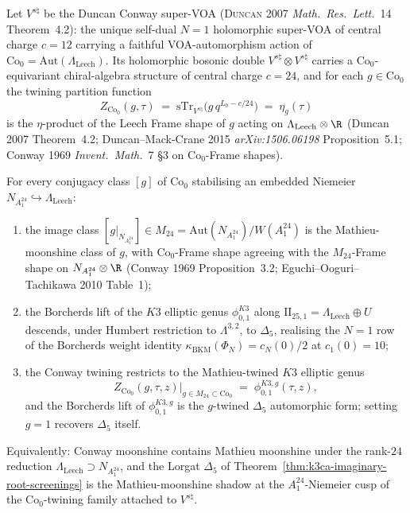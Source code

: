 \begin{proposition}
\label{prop:k3ca-conway-mathieu-reduction-Delta5}
Let $V^{s\natural}$ be the Duncan Conway super-VOA
(\textsc{Duncan 2007} \emph{Math.\ Res.\ Lett.}~14 Theorem~4.2):
the unique self-dual $N=1$ holomorphic super-VOA of central charge
$c=12$ carrying a faithful VOA-automorphism action of
$\mathrm{Co}_0 = \mathrm{Aut}(\Lambda_{\mathrm{Leech}})$. Its
holomorphic bosonic double $V^{s\natural}\otimes V^{s\natural}$
carries a $\mathrm{Co}_0$-equivariant chiral-algebra structure of
central charge $c=24$, and for each $g\in\mathrm{Co}_0$ the twining
partition function
\[
 Z_{\mathrm{Co}_0}(g,\tau)\;=\;\mathrm{sTr}_{V^{s\natural}}\bigl(g\,q^{L_0-c/24}\bigr)
 \;=\;\eta_g(\tau)
\]
is the $\eta$-product of the Leech Frame shape of $g$ acting on
$\Lambda_{\mathrm{Leech}}\otimes\R$
\textup{(}Duncan 2007 Theorem~4.2; Duncan--Mack-Crane 2015
\emph{arXiv:1506.06198} Proposition~5.1; Conway 1969 \emph{Invent.\
Math.}~7 \S3 on $\mathrm{Co}_0$-Frame shapes\textup{)}.

For every conjugacy class $[g]$ of $\mathrm{Co}_0$ stabilising an
embedded Niemeier $N_{A_1^{24}}\hookrightarrow\Lambda_{\mathrm{Leech}}$:
\begin{enumerate}[label=\textup{(\roman*)}]
 \item the image class
 $[g|_{N_{A_1^{24}}}]\in M_{24} =
 \mathrm{Aut}(N_{A_1^{24}})/W(A_1^{24})$ is the Mathieu-moonshine
 class of $g$, with $\mathrm{Co}_0$-Frame shape agreeing with the
 $M_{24}$-Frame shape on $N_{A_1^{24}}\otimes\R$
 \textup{(}Conway 1969 Proposition~3.2; Eguchi--Ooguri--Tachikawa
 2010 Table~1\textup{)};
 \item the Borcherds lift of the $K3$ elliptic genus
 $\phi_{0,1}^{K3}$ along $\mathrm{II}_{25,1} =
 \Lambda_{\mathrm{Leech}}\oplus U$ descends, under Humbert
 restriction to $\Lambda^{3,2}$, to $\Delta_5$, realising the
 $N=1$ row of the Borcherds weight identity
 $\kappa_{\mathrm{BKM}}(\Phi_N) = c_N(0)/2$ at $c_1(0)=10$;
 \item the Conway twining restricts to the Mathieu-twined $K3$
 elliptic genus
 \[
 Z_{\mathrm{Co}_0}(g,\tau,z)\bigr|_{g\in M_{24}\subset\mathrm{Co}_0}
 \;=\;\phi_{0,1}^{K3,g}(\tau,z),
 \]
 and the Borcherds lift of $\phi_{0,1}^{K3,g}$ is the $g$-twined
 $\Delta_5$ automorphic form; setting $g=1$ recovers $\Delta_5$
 itself.
\end{enumerate}
Equivalently: Conway moonshine contains Mathieu moonshine under the
rank-$24$ reduction $\Lambda_{\mathrm{Leech}}\supset N_{A_1^{24}}$,
and the Lorgat $\Delta_5$ of
Theorem~\ref{thm:k3ca-imaginary-root-screenings} is the
Mathieu-moonshine shadow at the $A_1^{24}$-Niemeier cusp of the
$\mathrm{Co}_0$-twining family attached to $V^{s\natural}$.
\end{proposition}

